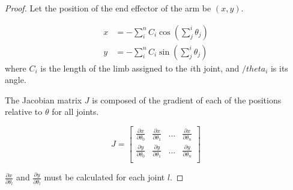 \documentclass{article}
\begin{document}
\begin{proof}
  Let the position of the end effector of the arm be $(x, y)$.

  \begin{align}
    x &= - \sum^n_i C_i \cos \left( \sum^i_j \theta_j \right) \\
    y &= - \sum^n_i C_i \sin \left( \sum^i_j \theta_j \right)
  \end{align}
  where $C_i$ is the length of the limb assigned to the $i$th joint, and $/theta_i$ is its angle.

  The Jacobian matrix $J$ is composed of the gradient of each of the positions relative to $\theta$ for all joints.

  \begin{equation}
    J =
    \begin{bmatrix}
      \frac {\partial x} {\partial \theta_0} & \frac {\partial x} {\partial \theta_1} & ... & \frac {\partial x} {\partial \theta_n} \\
      \frac {\partial y} {\partial \theta_0} & \frac {\partial y} {\partial \theta_1} & ... & \frac {\partial y} {\partial \theta_n} \\
    \end{bmatrix}
  \end{equation}

  $\frac {\partial x} {\partial \theta_l}$ and $\frac {\partial y} {\partial \theta_l}$ must be calculated for each joint $l$.


\end{proof}
\end{document}
